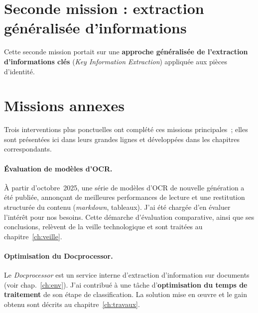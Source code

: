 \section{Seconde mission : extraction généralisée d'informations}

Cette seconde mission portait sur une \textbf{approche généralisée de l'extraction
d'informations clés} (\emph{Key Information Extraction}) appliquée aux pièces
d'identité.


\section{Missions annexes}

Trois interventions plus ponctuelles ont complété ces missions principales~; elles
sont présentées ici dans leurs grandes lignes et développées dans les chapitres
correspondants.

\paragraph{Évaluation de modèles d'OCR.}
À partir d'octobre~2025, une série de modèles d'OCR de nouvelle génération a été
publiée, annonçant de meilleures performances de lecture et une restitution
structurée du contenu (\emph{markdown}, tableaux). J'ai été chargée d'en évaluer
l'intérêt pour nos besoins. Cette démarche d'évaluation comparative, ainsi que ses
conclusions, relèvent de la veille technologique et sont traitées au
chapitre~\ref{ch:veille}.

\paragraph{Optimisation du Docprocessor.}
Le \emph{Docprocessor} est un service interne d'extraction d'information sur
documents (voir chap.~\ref{ch:env}). J'ai contribué à une tâche d'\textbf{optimisation
du temps de traitement} de son étape de classification. La solution mise en \oe uvre
et le gain obtenu sont décrits au chapitre~\ref{ch:travaux}.

